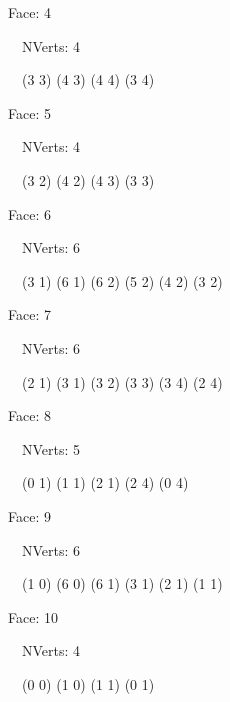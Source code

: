 \documentclass{article}
\begin{document}
    {\footnotesize

    Face: 4

    \   \    NVerts: 4

     \   \   (3 3) (4 3) (4 4) (3 4)}

    {\footnotesize

    Face: 5

    \   \    NVerts: 4

     \   \   (3 2) (4 2) (4 3) (3 3)}

    {\footnotesize

    Face: 6

    \   \    NVerts: 6

     \   \   (3 1) (6 1) (6 2) (5 2) (4 2) (3 2)}

    {\footnotesize

    Face: 7

    \   \    NVerts: 6

     \   \   (2 1) (3 1) (3 2) (3 3) (3 4) (2 4)}

    {\footnotesize

    Face: 8

    \   \    NVerts: 5

     \   \   (0 1) (1 1) (2 1) (2 4) (0 4)}

    {\footnotesize

    Face: 9

    \   \    NVerts: 6

     \   \   (1 0) (6 0) (6 1) (3 1) (2 1) (1 1)}

    {\footnotesize

    Face: 10

    \   \    NVerts: 4

     \   \   (0 0) (1 0) (1 1) (0 1)}


     \newpage
\end{document}
